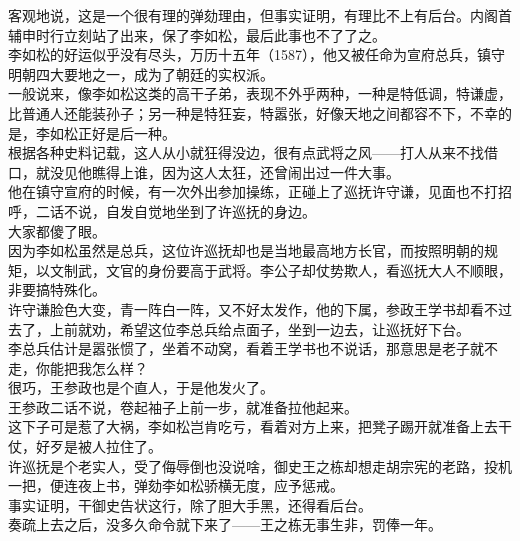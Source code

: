 \begin{multicols}{\theparacolNo}
客观地说，这是一个很有理的弹劾理由，但事实证明，有理比不上有后台。内阁首辅申时行立刻站了出来，保了李如松，最后此事也不了了之。\\

李如松的好运似乎没有尽头，万历十五年（1587），他又被任命为宣府总兵，镇守明朝四大要地之一，成为了朝廷的实权派。\\

一般说来，像李如松这类的高干子弟，表现不外乎两种，一种是特低调，特谦虚，比普通人还能装孙子；另一种是特狂妄，特嚣张，好像天地之间都容不下，不幸的是，李如松正好是后一种。\\

根据各种史料记载，这人从小就狂得没边，很有点武将之风——打人从来不找借口，就没见他瞧得上谁，因为这人太狂，还曾闹出过一件大事。\\

他在镇守宣府的时候，有一次外出参加操练，正碰上了巡抚许守谦，见面也不打招呼，二话不说，自发自觉地坐到了许巡抚的身边。\\

大家都傻了眼。\\

因为李如松虽然是总兵，这位许巡抚却也是当地最高地方长官，而按照明朝的规矩，以文制武，文官的身份要高于武将。李公子却仗势欺人，看巡抚大人不顺眼，非要搞特殊化。\\

许守谦脸色大变，青一阵白一阵，又不好太发作，他的下属，参政王学书却看不过去了，上前就劝，希望这位李总兵给点面子，坐到一边去，让巡抚好下台。\\

李总兵估计是嚣张惯了，坐着不动窝，看着王学书也不说话，那意思是老子就不走，你能把我怎么样？\\

很巧，王参政也是个直人，于是他发火了。\\

王参政二话不说，卷起袖子上前一步，就准备拉他起来。\\

这下子可是惹了大祸，李如松岂肯吃亏，看着对方上来，把凳子踢开就准备上去干仗，好歹是被人拉住了。\\

许巡抚是个老实人，受了侮辱倒也没说啥，御史王之栋却想走胡宗宪的老路，投机一把，便连夜上书，弹劾李如松骄横无度，应予惩戒。\\

事实证明，干御史告状这行，除了胆大手黑，还得看后台。\\

奏疏上去之后，没多久命令就下来了——王之栋无事生非，罚俸一年。\\


\end{multicols}
